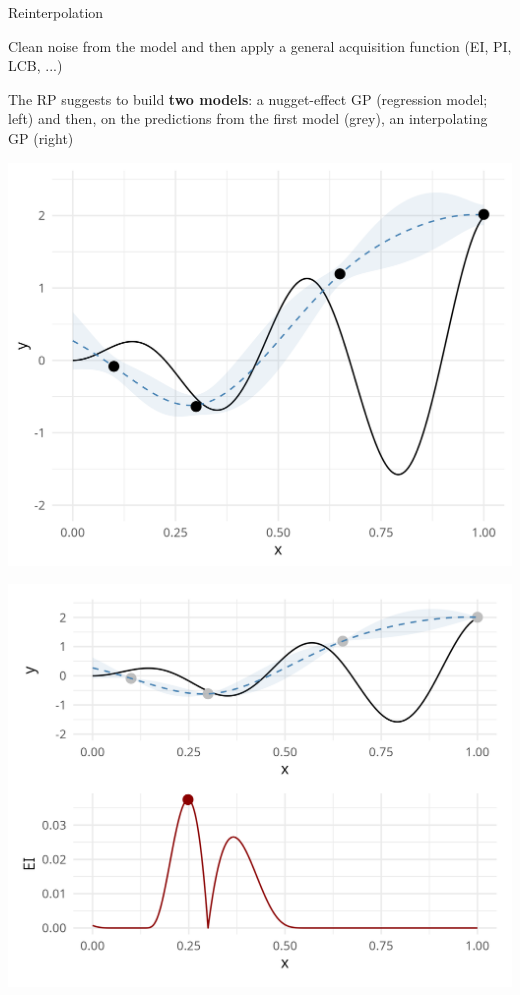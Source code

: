 \documentclass[11pt,compress,t,notes=noshow, xcolor=table]{beamer}
\begin{document}
\begin{vbframe}{Reinterpolation}

Clean noise from the model and then apply a general acquisition function (EI, PI, LCB, ...)

\lz 

The RP suggests to build \textbf{two models}: a nugget-effect GP (regression model; left) and then, on the predictions from the first model (grey), an interpolating GP (right)

\begin{minipage}[b]{0.45\textwidth}
  \includegraphics[width = \textwidth]{figure_man/noisy_2.png}
\end{minipage}
\hfill
\begin{minipage}[b]{0.45\textwidth}
  \includegraphics[width = \textwidth]{figure_man/noisy_4.png}
\end{minipage}


\end{vbframe}
\end{document}
